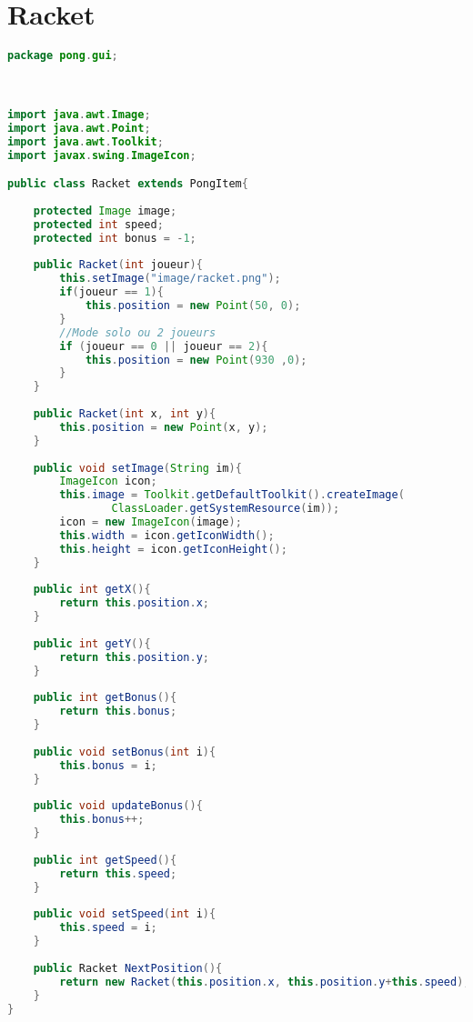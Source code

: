 \section{Racket}
\begin{lstlisting}[language=Java]
package pong.gui;



import java.awt.Image;
import java.awt.Point;
import java.awt.Toolkit;
import javax.swing.ImageIcon;

public class Racket extends PongItem{
	
	protected Image image;
	protected int speed;
	protected int bonus = -1;
	
	public Racket(int joueur){
		this.setImage("image/racket.png");
		if(joueur == 1){
			this.position = new Point(50, 0);
		}
		//Mode solo ou 2 joueurs
		if (joueur == 0 || joueur == 2){
			this.position = new Point(930 ,0);
		}
	}
	
	public Racket(int x, int y){
		this.position = new Point(x, y);
	}
	
	public void setImage(String im){
		ImageIcon icon;
		this.image = Toolkit.getDefaultToolkit().createImage(
				ClassLoader.getSystemResource(im));
		icon = new ImageIcon(image);
		this.width = icon.getIconWidth();
		this.height = icon.getIconHeight();
	}
	
	public int getX(){
		return this.position.x;
	}
	
	public int getY(){
		return this.position.y;
	}
	
	public int getBonus(){
		return this.bonus;
	}
	
	public void setBonus(int i){
		this.bonus = i;
	}
	
	public void updateBonus(){
		this.bonus++;
	}
	
	public int getSpeed(){
		return this.speed;
	}
	
	public void setSpeed(int i){
		this.speed = i;
	}
	
	public Racket NextPosition(){
		return new Racket(this.position.x, this.position.y+this.speed);
	}
}

\end{lstlisting}